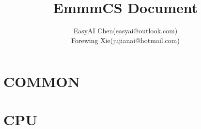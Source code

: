 \documentclass[10pt,fancyhdr,UTF8]{ctexbook}
\title{EmmmCS Document}
\author{
        EasyAI Chen(easyai@outlook.com)\\
        Forewing Xie(jujianai@hotmail.com)
    }
\begin{document}
\begin{sloppypar}
\maketitle
\tableofcontents
\mainmatter
\part{COMMON}

\part{CPU}


\end{sloppypar}
\end{document}

